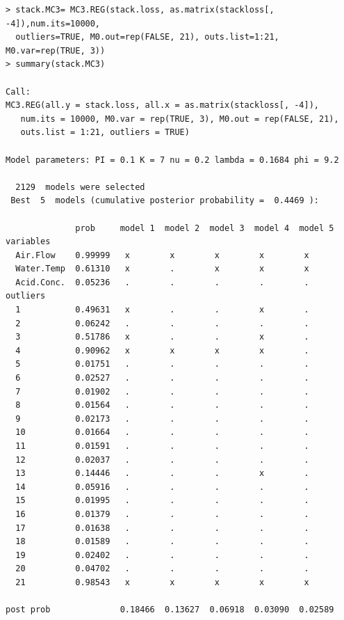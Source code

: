 \documentclass[11]{article}
\begin{document}
\newpage
\begin{verbatim}
> stack.MC3= MC3.REG(stack.loss, as.matrix(stackloss[, -4]),num.its=10000,
  outliers=TRUE, M0.out=rep(FALSE, 21), outs.list=1:21, M0.var=rep(TRUE, 3))
> summary(stack.MC3)

Call:
MC3.REG(all.y = stack.loss, all.x = as.matrix(stackloss[, -4]),  
   num.its = 10000, M0.var = rep(TRUE, 3), M0.out = rep(FALSE, 21),
   outs.list = 1:21, outliers = TRUE)

Model parameters: PI = 0.1 K = 7 nu = 0.2 lambda = 0.1684 phi = 9.2

  2129  models were selected
 Best  5  models (cumulative posterior probability =  0.4469 ): 

              prob     model 1  model 2  model 3  model 4  model 5
variables                                                         
  Air.Flow    0.99999   x        x        x        x        x     
  Water.Temp  0.61310   x        .        x        x        x     
  Acid.Conc.  0.05236   .        .        .        .        .     
outliers                                                          
  1           0.49631   x        .        .        x        .     
  2           0.06242   .        .        .        .        .     
  3           0.51786   x        .        .        x        .     
  4           0.90962   x        x        x        x        .     
  5           0.01751   .        .        .        .        .     
  6           0.02527   .        .        .        .        .     
  7           0.01902   .        .        .        .        .     
  8           0.01564   .        .        .        .        .     
  9           0.02173   .        .        .        .        .     
  10          0.01664   .        .        .        .        .     
  11          0.01591   .        .        .        .        .     
  12          0.02037   .        .        .        .        .     
  13          0.14446   .        .        .        x        .     
  14          0.05916   .        .        .        .        .     
  15          0.01995   .        .        .        .        .     
  16          0.01379   .        .        .        .        .     
  17          0.01638   .        .        .        .        .     
  18          0.01589   .        .        .        .        .     
  19          0.02402   .        .        .        .        .     
  20          0.04702   .        .        .        .        .     
  21          0.98543   x        x        x        x        x     
                                                                  
post prob              0.18466  0.13627  0.06918  0.03090  0.02589

\end{verbatim}
\end{document}
